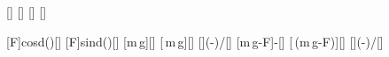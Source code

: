 [\kg]
[\newton]
[\degree]
[\mpss]

[F\cos\alpha]{\FZX*cosd(\alX)}[\newton]
[F\sin\alpha]{\FZX*sind(\alX)}[\newton]
[m\,g]{\mKX*\gX}[\newton]
[\mu\,m\,g]{\muGX*\NSX}[\newton]
[]{(\FxX-\RSX)/\mKX}[\mpss]
[m\,g-F\sin\alpha]{\mKX*\gX-\FyX}[\newton]
[\mu\,(m\,g-F\sin\alpha)]{\muGX*\FNX}[\newton]
[]{(\FxX-\FRX)/\mKX}[\mpss]
